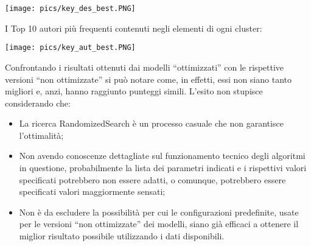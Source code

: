 \documentclass[12pt,oneside]{article}
\begin{document}
        \texttt{[image: pics/key\_des\_best.PNG]}
        
        \begin{justify}
        I Top 10 autori più frequenti contenuti negli elementi di ogni cluster:
        \end{justify}
        
        \texttt{[image: pics/key\_aut\_best.PNG]}

        \begin{justify}
        Confrontando i risultati ottenuti dai modelli “ottimizzati” con le rispettive versioni “non ottimizzate” si può notare come, in effetti, essi non siano tanto migliori e, anzi, hanno raggiunto punteggi simili. L'esito non stupisce considerando che: 
        \begin{itemize}
            \item La ricerca RandomizedSearch è un processo casuale che non garantisce l’ottimalità;
            \item Non avendo conoscenze dettagliate sul funzionamento tecnico degli algoritmi in questione, probabilmente la lista dei parametri indicati e i rispettivi valori specificati potrebbero non essere adatti, o comunque, potrebbero essere specificati valori maggiormente sensati;
            \item Non è da escludere la possibilità per cui le configurazioni predefinite, usate per le versioni “non ottimizzate” dei modelli, siano già efficaci a ottenere il miglior risultato possibile utilizzando i dati disponibili.
        \end{itemize}
    \end{justify}
\end{document}
